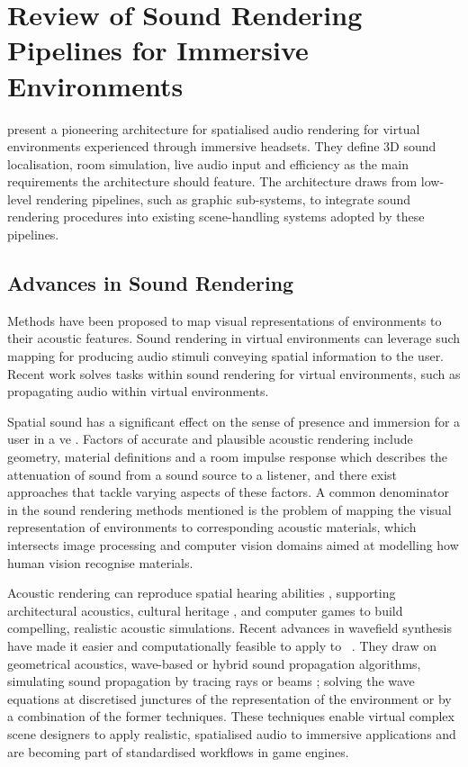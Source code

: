 \section{Review of Sound Rendering Pipelines for Immersive Environments}\label{sec:lr-visual-acoustic-mapping}
\cite{naef2002spatialized} present a pioneering architecture for spatialised audio rendering for virtual environments experienced through immersive headsets. They define 3D sound localisation, room simulation, live audio input and efficiency as the main requirements the architecture should feature. The architecture draws from low-level rendering pipelines, such as graphic sub-systems, to integrate sound rendering procedures into existing scene-handling systems adopted by these pipelines. 

\subsection{Advances in Sound Rendering}
Methods have been proposed to map visual representations of environments to their acoustic features. Sound rendering in virtual environments can leverage such mapping for producing audio stimuli conveying spatial information to the user. Recent work solves tasks within sound rendering for virtual environments, such as propagating audio within virtual environments.\par
Spatial sound has a significant effect on the sense of presence and immersion for a user in a \acrshort{ve} \citep{poeschl13}. Factors of accurate and plausible acoustic rendering include geometry, material definitions and a room impulse response which describes the attenuation of sound from a sound source to a listener, and there exist approaches that tackle varying aspects of these factors. A common denominator in the sound rendering methods mentioned is the problem of mapping the visual representation of environments to corresponding acoustic materials, which intersects image processing and computer vision domains aimed at modelling how human vision recognise materials.\par%
Acoustic rendering can reproduce spatial hearing abilities \citep{lokki2005navigation}, supporting architectural acoustics, cultural heritage \citep{berardi2016acoustic, vorlander2015virtual}, and computer games \citep{raghuvanshi2014parametric, mehra2015wave} to build compelling, realistic acoustic simulations. Recent advances in wavefield synthesis have made it easier and computationally feasible to apply to ~\citep{raghuvanshi2014parametric}. They draw on geometrical acoustics, wave-based or hybrid sound propagation algorithms, simulating sound propagation by tracing rays or beams \citep{hulusic2012acoustic}; solving the wave equations at discretised junctures of the representation of the environment or by a combination of the former techniques. These techniques enable virtual complex scene designers to apply realistic, spatialised audio to immersive applications and are becoming part of standardised workflows in game engines.\par
